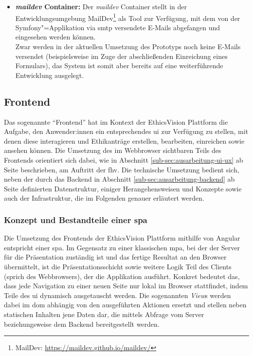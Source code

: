 \documentclass[a4paper,12pt,twoside,numbers=noendperiod]{scrreprt}
\begin{document}
\begin{itemize}
    \item \textbf{\textit{maildev} Container:} Der \textit{maildev} Container stellt in der Entwicklungsumgebung MailDev\footnote{MailDev: \url{https://maildev.github.io/maildev/}} als Tool zur Verfügung, mit dem von der Symfony"=Applikation via \ac{smtp} versendete E-Mails abgefangen und eingesehen werden können.\\
    Zwar werden in der aktuellen Umsetzung des Prototyps noch keine E-Mails versendet (beispielsweise im Zuge der abschließenden Einreichung eines Formulars), das System ist somit aber bereits auf eine weiterführende Entwicklung ausgelegt.
\end{itemize}

\subsection{Frontend}
\label{sub-sec:ausarbeitung-frontend}

Das sogenannte \enquote{Frontend} hat im Kontext der EthicsVision Plattform die Aufgabe, den Anwender:innen ein entsprechendes \acl{ui} zur Verfügung zu stellen, mit denen diese interagieren und Ethikanträge erstellen, bearbeiten, einreichen sowie ansehen können. Die Umsetzung des im Webbrowser sichtbaren Teils des Frontends orientiert sich dabei, wie in Abschnitt \ref{sub-sec:ausarbeitung-ui-ux} ab Seite \pageref{sub-sec:ausarbeitung-ui-ux} beschrieben, am Auftritt der \acl{fhv}. Die technische Umsetzung bedient sich, neben der durch das Backend in Abschnitt \ref{sub-sec:ausarbeitung-backend} ab Seite \pageref{sub-sec:ausarbeitung-backend} definierten Datenstruktur, einiger Herangehensweisen und Konzepte sowie auch der Infrastruktur, die im Folgenden genauer erläutert werden.

\subsubsection*{Konzept und Bestandteile einer \acl{spa}}
\label{sub-sub-sec:konzept-bestandteile-spa}

Die Umsetzung des Frontends der EthicsVision Plattform mithilfe von Angular entspricht einer \acl{spa}. Im Gegensatz zu einer klassischen \ac{mpa}, bei der der Server für die Präsentation zuständig ist und das fertige Resultat an den Browser übermittelt, ist die Präsentationsschicht sowie weitere Logik Teil des Clients (sprich des Webbrowsers), der die Applikation ausführt. Konkret bedeutet das, dass jede Navigation zu einer neuen Seite nur lokal im Browser stattfindet, indem Teile des \ac{ui} dynamisch ausgetauscht werden. Die sogenannten \textit{View}s werden dabei im \ac{dom} abhängig von den ausgeführten Aktionen ersetzt und stellen neben statischen Inhalten jene Daten dar, die mittels Abfrage vom Server beziehungsweise dem Backend bereitgestellt werden. \cite[5\psqq]{scott_spa_2015}
\end{document}

